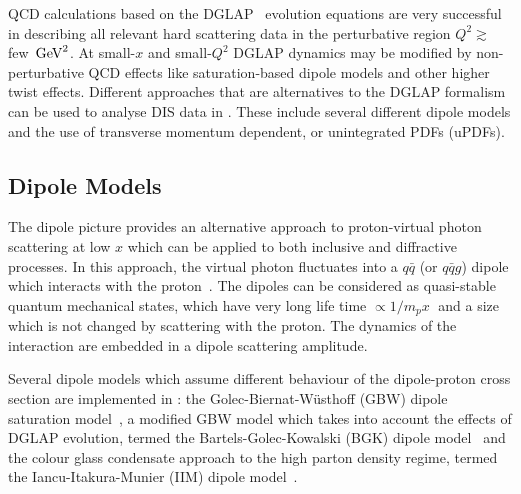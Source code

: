 

QCD calculations based on the DGLAP~\cite{Gribov:1972ri,Gribov:1972rt,Lipatov:1974qm,
Dokshitzer:1977sg,Altarelli:1977zs} evolution equations are very successful in describing
all relevant hard scattering data in the perturbative region $Q^2 \gtrsim $ few $ \,\text{Ge\hspace{-.08em}V}^2$.
At small-$x$ and small-$Q^2$ DGLAP dynamics may be modified by non-perturbative QCD 
effects like saturation-based dipole models and other higher twist effects.
%
Different approaches that are alternatives to the DGLAP formalism can be used to analyse DIS data in \fitter.
These include several different dipole models and the use of 
transverse momentum dependent, or unintegrated PDFs (uPDFs).

\subsection{Dipole Models}

The dipole picture provides an alternative approach to proton-virtual photon
 scattering at low $x$ which can be applied to both inclusive and 
diffractive processes.
 In this approach, the virtual photon fluctuates into a $q\bar q$ (or $q\bar q g$) 
 dipole which interacts with the proton~\cite{NNZ:91}.  
The dipoles can be considered as quasi-stable quantum mechanical states, which have very long 
life time $\propto 1/m_p x\;$ and a size which is not changed by scattering with the proton.
The dynamics of the interaction are embedded in a dipole scattering amplitude.

Several dipole models which assume different behaviour of the dipole-proton 
cross section are implemented in \fitter:
the Golec-Biernat-W\"usthoff (GBW)
dipole saturation model~\cite{Golec-Biernat:1998js},
a modified GBW model which takes into account the effects of  
DGLAP evolution, termed the Bartels-Golec-Kowalski (BGK) dipole model~\cite{Bartels:2002cj}
and the colour glass condensate approach to the high parton density 
regime, termed the Iancu-Itakura-Munier (IIM) dipole model~\cite{Iancu:2003ge}.

